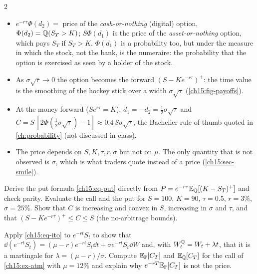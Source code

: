\begin{paracol}{2}
\begin{intuition}
\begin{itemize}[nosep]
  \item $e^{-r\tau}\Phi(d_2)=$ price of the \emph{cash-or-nothing} (digital) option, $\Phi(d_2)=\mathbb{Q}(S_T>K)$; $S\Phi(d_1)$ is the price of the \emph{asset-or-nothing} option, which pays $S_T$ if $S_T>K$.
        $\Phi(d_1)$ is a probability too, but under the measure in which the stock, not the bank, is the numeraire: the probability that the option is exercised as seen by a holder of the stock.
  \item As $\sigma\sqrt\tau\to0$ the option becomes the forward $(S-Ke^{-r\tau})^+$: the time value is the smoothing of the hockey stick over a width $\sigma\sqrt\tau$ (\cref{ch15:fig-payoffs}).
  \item At the money forward ($Se^{r\tau}=K$), $d_1=-d_2=\tfrac12\sigma\sqrt\tau$ and $C=S\,[2\Phi(\tfrac12\sigma\sqrt\tau)-1]\approx0.4\,S\sigma\sqrt\tau$, the Bachelier rule of thumb quoted in \cref{ch:probability} (not discussed in class).
  \item The price depends on $S,K,\tau,r,\sigma$ but not on $\mu$. The only quantity that is not observed is $\sigma$, which is what traders quote instead of a price (\cref{ch15:sec-smile}).
\end{itemize}
\end{intuition}

\begin{exercise}\label{ch15:ex-formula}
Derive the put formula \eqref{ch15:eq-put} directly from $P=e^{-r\tau}\mathbb{E}_{\mathbb{Q}}[(K-S_T)^+]$ and check parity. Evaluate the call and the put for $S=100$, $K=90$, $\tau=0.5$, $r=3\%$, $\sigma=25\%$.
Show that $C$ is increasing and convex in $S$, increasing in $\sigma$ and $\tau$, and that $(S-Ke^{-r\tau})^+\le C\le S$ (the no-arbitrage bounds).
\end{exercise}

\begin{exercise}\label{ch15:ex-girsanov}
Apply \eqref{ch15:eq-ito} to $e^{-rt}S_t$ to show that $\dd(e^{-rt}S_t)=(\mu-r)e^{-rt}S_t\dd t+\sigma e^{-rt}S_t\dd W$ and, with $W^{\mathbb{Q}}_t=W_t+\lambda t$, that it is a martingale for $\lambda=(\mu-r)/\sigma$. Compute
$\mathbb{E}_{\mathbb{P}}[C_T]$ and $\mathbb{E}_{\mathbb{Q}}[C_T]$ for the call of \cref{ch15:ex-atm} with $\mu=12\%$ and explain why $e^{-rT}\mathbb{E}_{\mathbb{P}}[C_T]$ is not the price.
\end{exercise}


\end{paracol}
